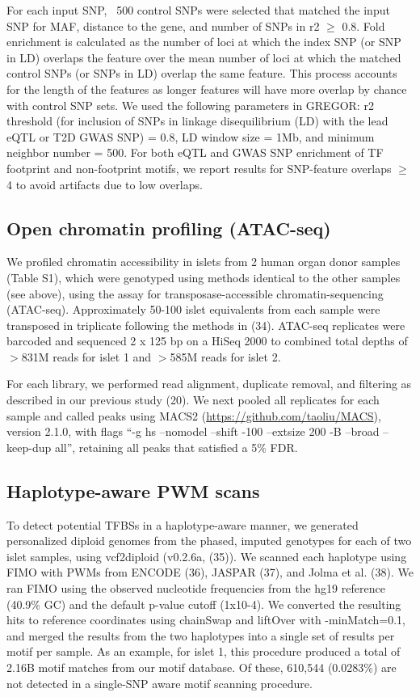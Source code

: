For each input SNP, ~500 control SNPs were selected that matched the input SNP for MAF, distance to the gene, and number of SNPs in r2 $\geq$ 0.8. Fold enrichment is calculated as the number of loci at which the index SNP (or SNP in LD) overlaps the feature over the mean number of loci at which the matched control SNPs (or SNPs in LD) overlap the same feature. This process accounts for the length of the features as longer features will have more overlap by chance with control SNP sets. We used the following parameters in GREGOR: r2 threshold (for inclusion of SNPs in linkage disequilibrium (LD) with the lead eQTL or T2D GWAS SNP) = 0.8, LD window size = 1Mb, and minimum neighbor number = 500. For both eQTL and GWAS SNP enrichment of TF footprint and non-footprint motifs, we report results for SNP-feature overlaps $\geq$ 4 to avoid artifacts due to low overlaps.

\subsection{Open chromatin profiling (ATAC-seq)}
We profiled chromatin accessibility in islets from 2 human organ donor samples (Table S1), which were genotyped using methods identical to the other samples (see above), using the assay for transposase-accessible chromatin-sequencing (ATAC-seq).  Approximately 50-100 islet equivalents from each sample were transposed in triplicate following the methods in (34).  ATAC-seq replicates were barcoded and sequenced 2 x 125 bp on a HiSeq 2000 to combined total depths of $>$831M reads for islet 1 and $>$585M reads for islet 2.

For each library, we performed read alignment, duplicate removal, and filtering as described in our previous study (20). We next pooled all replicates for each sample and called peaks using MACS2 (\url{https://github.com/taoliu/MACS}), version 2.1.0, with flags “-g hs --nomodel --shift -100 --extsize 200 -B --broad --keep-dup all”, retaining all peaks that satisfied a 5\% FDR.

\subsection{Haplotype-aware PWM scans}
To detect potential TFBSs in a haplotype-aware manner, we generated personalized diploid genomes from the phased, imputed genotypes for each of two islet samples, using vcf2diploid (v0.2.6a, (35)). We scanned each haplotype using FIMO with PWMs from ENCODE (36), JASPAR (37), and Jolma et al. (38). We ran FIMO using the observed nucleotide frequencies from the hg19 reference (40.9\% GC) and the default p-value cutoff (1x10-4). We converted the resulting hits to reference coordinates using chainSwap and liftOver with -minMatch=0.1, and merged the results from the two haplotypes into a single set of results per motif per sample. As an example, for islet 1, this procedure produced a total of 2.16B motif matches from our motif database. Of these, 610,544 (0.0283\%) are not detected in a single-SNP aware motif scanning procedure.

